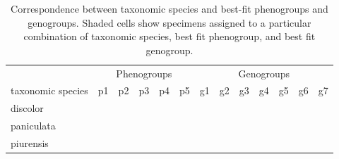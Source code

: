 \documentclass[
  11pt,
]{article}
\begin{document}
\begin{table}[H]

\caption{\label{tab:cladeIIIfinalSummary}Correspondence between taxonomic species and best-fit phenogroups and genogroups. Shaded cells show specimens assigned to a particular combination of taxonomic species, best fit phenogroup, and best fit genogroup.}
\centering
\fontsize{8}{10}\selectfont
\begin{tabular}[t]{>{}l|>{}l|>{}l|>{}l|>{}l|>{}l||>{}l|>{}l|>{}l|>{}l|>{}l|>{}l|l}
\toprule
\multicolumn{1}{c}{} & \multicolumn{5}{c}{Phenogroups} & \multicolumn{7}{c}{Genogroups} \\
\cmidrule(l{3pt}r{3pt}){2-6} \cmidrule(l{3pt}r{3pt}){7-13}
taxonomic species & p1 & p2 & p3 & p4 & p5 & g1 & g2 & g3 & g4 & g5 & g6 & g7\\
\midrule
discolor & \cellcolor[HTML]{FFFFFF}{\textcolor[HTML]{FFFFFF}{0}} & \cellcolor[HTML]{FFFFFF}{\textcolor[HTML]{FFFFFF}{0}} & \cellcolor[HTML]{FFFFFF}{\textcolor[HTML]{FFFFFF}{0}} & \cellcolor[HTML]{BBBBBB}{\textcolor[HTML]{BBBBBB}{1}} & \cellcolor[HTML]{FFFFFF}{\textcolor[HTML]{FFFFFF}{0}} & \cellcolor[HTML]{FFFFFF}{\textcolor[HTML]{FFFFFF}{0}} & \cellcolor[HTML]{FFFFFF}{\textcolor[HTML]{FFFFFF}{0}} & \cellcolor[HTML]{BBBBBB}{\textcolor[HTML]{BBBBBB}{1}} & \cellcolor[HTML]{FFFFFF}{\textcolor[HTML]{FFFFFF}{0}} & \cellcolor[HTML]{FFFFFF}{\textcolor[HTML]{FFFFFF}{0}} & \cellcolor[HTML]{FFFFFF}{\textcolor[HTML]{FFFFFF}{0}} & \cellcolor[HTML]{FFFFFF}{\textcolor[HTML]{FFFFFF}{0}}\\
\midrule
paniculata & \cellcolor[HTML]{BBBBBB}{\textcolor[HTML]{BBBBBB}{1}} & \cellcolor[HTML]{FFFFFF}{\textcolor[HTML]{FFFFFF}{0}} & \cellcolor[HTML]{BBBBBB}{\textcolor[HTML]{BBBBBB}{1}} & \cellcolor[HTML]{BBBBBB}{\textcolor[HTML]{BBBBBB}{1}} & \cellcolor[HTML]{FFFFFF}{\textcolor[HTML]{FFFFFF}{0}} & \cellcolor[HTML]{FFFFFF}{\textcolor[HTML]{FFFFFF}{0}} & \cellcolor[HTML]{FFFFFF}{\textcolor[HTML]{FFFFFF}{0}} & \cellcolor[HTML]{FFFFFF}{\textcolor[HTML]{FFFFFF}{0}} & \cellcolor[HTML]{FFFFFF}{\textcolor[HTML]{FFFFFF}{0}} & \cellcolor[HTML]{BBBBBB}{\textcolor[HTML]{BBBBBB}{1}} & \cellcolor[HTML]{FFFFFF}{\textcolor[HTML]{FFFFFF}{0}} & \cellcolor[HTML]{BBBBBB}{\textcolor[HTML]{BBBBBB}{1}}\\
\midrule
piurensis & \cellcolor[HTML]{FFFFFF}{\textcolor[HTML]{FFFFFF}{0}} & \cellcolor[HTML]{BBBBBB}{\textcolor[HTML]{BBBBBB}{1}} & \cellcolor[HTML]{FFFFFF}{\textcolor[HTML]{FFFFFF}{0}} & \cellcolor[HTML]{FFFFFF}{\textcolor[HTML]{FFFFFF}{0}} & \cellcolor[HTML]{FFFFFF}{\textcolor[HTML]{FFFFFF}{0}} & \cellcolor[HTML]{BBBBBB}{\textcolor[HTML]{BBBBBB}{1}} & \cellcolor[HTML]{FFFFFF}{\textcolor[HTML]{FFFFFF}{0}} & \cellcolor[HTML]{FFFFFF}{\textcolor[HTML]{FFFFFF}{0}} & \cellcolor[HTML]{FFFFFF}{\textcolor[HTML]{FFFFFF}{0}} & \cellcolor[HTML]{FFFFFF}{\textcolor[HTML]{FFFFFF}{0}} & \cellcolor[HTML]{FFFFFF}{\textcolor[HTML]{FFFFFF}{0}} & \cellcolor[HTML]{FFFFFF}{\textcolor[HTML]{FFFFFF}{0}}\\

\end{tabular}
\end{table}
\end{document}
